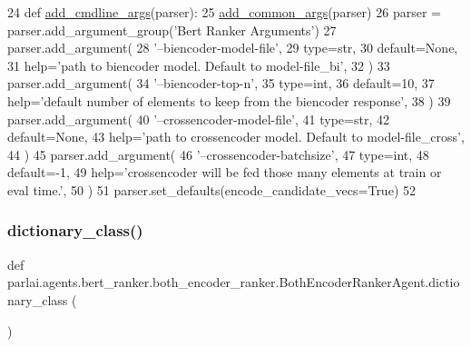 \begin{DoxyCode}
24     \textcolor{keyword}{def }\hyperlink{namespaceparlai_1_1agents_1_1drqa_1_1config_a62fdd5554f1da6be0cba185271058320}{add\_cmdline\_args}(parser):
25         \hyperlink{namespaceparlai_1_1agents_1_1bert__ranker_1_1helpers_ac2e926c3aba3a62be09e2c37dffcaee2}{add\_common\_args}(parser)
26         parser = parser.add\_argument\_group(\textcolor{stringliteral}{'Bert Ranker Arguments'})
27         parser.add\_argument(
28             \textcolor{stringliteral}{'--biencoder-model-file'},
29             type=str,
30             default=\textcolor{keywordtype}{None},
31             help=\textcolor{stringliteral}{'path to biencoder model. Default to model-file\_bi'},
32         )
33         parser.add\_argument(
34             \textcolor{stringliteral}{'--biencoder-top-n'},
35             type=int,
36             default=10,
37             help=\textcolor{stringliteral}{'default number of elements to keep from the biencoder response'},
38         )
39         parser.add\_argument(
40             \textcolor{stringliteral}{'--crossencoder-model-file'},
41             type=str,
42             default=\textcolor{keywordtype}{None},
43             help=\textcolor{stringliteral}{'path to crossencoder model. Default to model-file\_cross'},
44         )
45         parser.add\_argument(
46             \textcolor{stringliteral}{'--crossencoder-batchsize'},
47             type=int,
48             default=-1,
49             help=\textcolor{stringliteral}{'crossencoder will be fed those many elements at train or eval time.'},
50         )
51         parser.set\_defaults(encode\_candidate\_vecs=\textcolor{keyword}{True})
52 
\end{DoxyCode}
\mbox{\label{classparlai_1_1agents_1_1bert__ranker_1_1both__encoder__ranker_1_1BothEncoderRankerAgent_a4fd71b73fc926491aedc3da5921f62ca}} 
\subsubsection{\texorpdfstring{dictionary\+\_\+class()}{dictionary\_class()}}
{\footnotesize\ttfamily def parlai.\+agents.\+bert\+\_\+ranker.\+both\+\_\+encoder\+\_\+ranker.\+Both\+Encoder\+Ranker\+Agent.\+dictionary\+\_\+class (\begin{DoxyParamCaption}{ }\end{DoxyParamCaption})\hspace{0.3cm}{\ttfamily [static]}}



